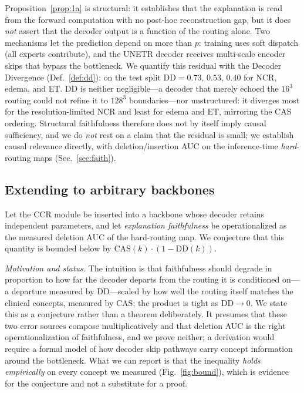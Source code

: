 \documentclass[runningheads]{llncs}
\begin{document}
\medskip\noindent
Proposition~\ref{prop:1a} is structural: it establishes that the explanation is read from the
forward computation with no post-hoc reconstruction gap, but it does \emph{not} assert that the
decoder output is a function of the routing alone. Two mechanisms let the prediction depend on
more than $p$: training uses soft dispatch (all experts contribute), and the UNETR decoder
receives multi-scale encoder skips that bypass the bottleneck. We quantify this residual with
the Decoder Divergence (Def.~\ref{def:dd}): on the test split $\mathrm{DD}=0.73,\,0.53,\,0.40$
for NCR, edema, and ET. DD is neither negligible---a decoder that merely echoed the $16^3$
routing could not refine it to $128^3$ boundaries---nor unstructured: it diverges most for the
resolution-limited NCR and least for edema and ET, mirroring the CAS ordering. Structural
faithfulness therefore does not by itself imply causal sufficiency, and we do \emph{not} rest
on a claim that the residual is small; we establish causal relevance directly, with
deletion/insertion AUC on the inference-time \emph{hard}-routing maps (Sec.~\ref{sec:faith}).

\subsection{Extending to arbitrary backbones}
\begin{conjecture}\label{prop:1b}
Let the CCR module be inserted into a backbone whose decoder retains independent parameters, and
let \emph{explanation faithfulness} be operationalized as the measured deletion AUC of the
hard-routing map. We conjecture that this quantity is bounded below by
$\mathrm{CAS}(k)\cdot(1-\mathrm{DD}(k))$.
\end{conjecture}
\noindent\emph{Motivation and status.} The intuition is that faithfulness should degrade in
proportion to how far the decoder departs from the routing it is conditioned on---a departure
measured by $\mathrm{DD}$---scaled by how well the routing itself matches the clinical concepts,
measured by $\mathrm{CAS}$; the product is tight as $\mathrm{DD}\to0$. We state this as a
conjecture rather than a theorem deliberately. It presumes that these two error sources compose
multiplicatively and that deletion AUC is the right operationalization of faithfulness, and we
prove neither; a derivation would require a formal model of how decoder skip pathways carry
concept information around the bottleneck. What we can report is that the inequality
\emph{holds empirically} on every concept we measured (Fig.~\ref{fig:bound}), which is evidence
for the conjecture and not a substitute for a proof.
\end{document}
